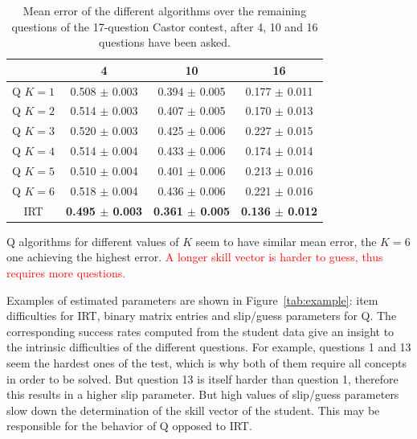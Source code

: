 \documentclass{sig-alternate}
\newcommand\alert[1]{\textcolor{red}{#1}}
\begin{document}
\begin{table}
\small\centering\begin{tabular}{@{}cccc@{}}
& 4 & 10 & 16\\
\hline
Q $K = 1$ & 0.508 $\pm$ 0.003 & 0.394 $\pm$ 0.005 & 0.177 $\pm$ 0.011 \\
Q $K = 2$ & 0.514 $\pm$ 0.003 & 0.407 $\pm$ 0.005 & 0.170 $\pm$ 0.013 \\
Q $K = 3$ & 0.520 $\pm$ 0.003 & 0.425 $\pm$ 0.006 & 0.227 $\pm$ 0.015 \\
Q $K = 4$ & 0.514 $\pm$ 0.004 & 0.433 $\pm$ 0.006 & 0.174 $\pm$ 0.014 \\
Q $K = 5$ & 0.510 $\pm$ 0.004 & 0.401 $\pm$ 0.006 & 0.213 $\pm$ 0.016 \\
Q $K = 6$ & 0.518 $\pm$ 0.004 & 0.436 $\pm$ 0.006 & 0.221 $\pm$ 0.016 \\
IRT & \textbf{0.495 $\pm$ 0.003} & \textbf{0.361 $\pm$ 0.005} & \textbf{0.136 $\pm$ 0.012} \\
\end{tabular}
\caption{Mean error of the different algorithms over the remaining questions of the 17-question Castor contest, after 4, 10 and 16 questions have been asked.}
\label{tab:error}
\end{table}

Q algorithms for different values of $K$ seem to have similar mean error, the $K = 6$ one achieving the highest error. \alert{A longer skill vector is harder to guess, thus requires more questions.}

Examples of estimated parameters are shown in Figure~\ref{tab:example}: item difficulties for IRT, binary matrix entries and slip/guess parameters for Q. The corresponding success rates computed from the student data give an insight to the intrinsic difficulties of the different questions. For example, questions 1 and 13 seem the hardest ones of the test, which is why both of them require all concepts in order to be solved. But question 13 is itself harder than question 1, therefore this results in a higher slip parameter. But high values of slip/guess parameters slow down the determination of the skill vector of the student. This may be responsible for the behavior of Q opposed to IRT.
\end{document}
